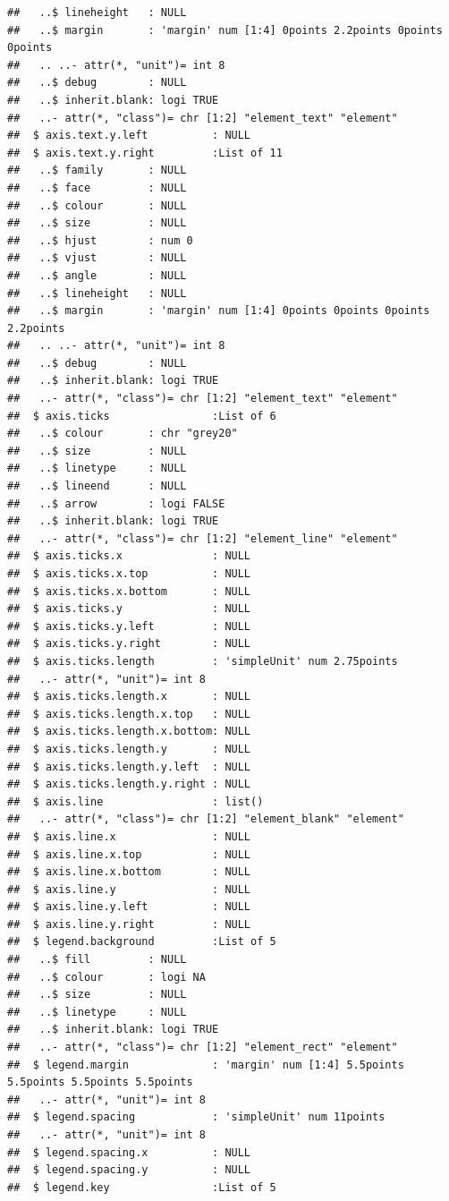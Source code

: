 \documentclass[
]{article}
\begin{document}
\begin{verbatim}
##   ..$ lineheight   : NULL
##   ..$ margin       : 'margin' num [1:4] 0points 2.2points 0points 0points
##   .. ..- attr(*, "unit")= int 8
##   ..$ debug        : NULL
##   ..$ inherit.blank: logi TRUE
##   ..- attr(*, "class")= chr [1:2] "element_text" "element"
##  $ axis.text.y.left          : NULL
##  $ axis.text.y.right         :List of 11
##   ..$ family       : NULL
##   ..$ face         : NULL
##   ..$ colour       : NULL
##   ..$ size         : NULL
##   ..$ hjust        : num 0
##   ..$ vjust        : NULL
##   ..$ angle        : NULL
##   ..$ lineheight   : NULL
##   ..$ margin       : 'margin' num [1:4] 0points 0points 0points 2.2points
##   .. ..- attr(*, "unit")= int 8
##   ..$ debug        : NULL
##   ..$ inherit.blank: logi TRUE
##   ..- attr(*, "class")= chr [1:2] "element_text" "element"
##  $ axis.ticks                :List of 6
##   ..$ colour       : chr "grey20"
##   ..$ size         : NULL
##   ..$ linetype     : NULL
##   ..$ lineend      : NULL
##   ..$ arrow        : logi FALSE
##   ..$ inherit.blank: logi TRUE
##   ..- attr(*, "class")= chr [1:2] "element_line" "element"
##  $ axis.ticks.x              : NULL
##  $ axis.ticks.x.top          : NULL
##  $ axis.ticks.x.bottom       : NULL
##  $ axis.ticks.y              : NULL
##  $ axis.ticks.y.left         : NULL
##  $ axis.ticks.y.right        : NULL
##  $ axis.ticks.length         : 'simpleUnit' num 2.75points
##   ..- attr(*, "unit")= int 8
##  $ axis.ticks.length.x       : NULL
##  $ axis.ticks.length.x.top   : NULL
##  $ axis.ticks.length.x.bottom: NULL
##  $ axis.ticks.length.y       : NULL
##  $ axis.ticks.length.y.left  : NULL
##  $ axis.ticks.length.y.right : NULL
##  $ axis.line                 : list()
##   ..- attr(*, "class")= chr [1:2] "element_blank" "element"
##  $ axis.line.x               : NULL
##  $ axis.line.x.top           : NULL
##  $ axis.line.x.bottom        : NULL
##  $ axis.line.y               : NULL
##  $ axis.line.y.left          : NULL
##  $ axis.line.y.right         : NULL
##  $ legend.background         :List of 5
##   ..$ fill         : NULL
##   ..$ colour       : logi NA
##   ..$ size         : NULL
##   ..$ linetype     : NULL
##   ..$ inherit.blank: logi TRUE
##   ..- attr(*, "class")= chr [1:2] "element_rect" "element"
##  $ legend.margin             : 'margin' num [1:4] 5.5points 5.5points 5.5points 5.5points
##   ..- attr(*, "unit")= int 8
##  $ legend.spacing            : 'simpleUnit' num 11points
##   ..- attr(*, "unit")= int 8
##  $ legend.spacing.x          : NULL
##  $ legend.spacing.y          : NULL
##  $ legend.key                :List of 5

\end{verbatim}
\end{document}
